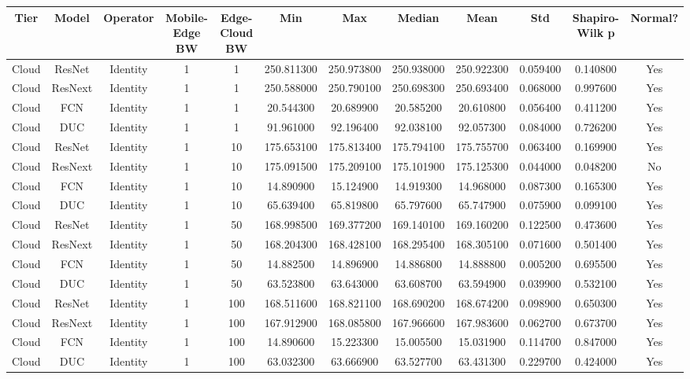 \begin{tabular}{|c||c||c||c||c||c||c||c||c||c||c||c|}
\toprule
Tier & Model & Operator & Mobile-Edge BW & Edge-Cloud BW & Min & Max & Median & Mean & Std & Shapiro-Wilk p & Normal? \\
\midrule
Cloud & ResNet & Identity & 1 & 1 & 250.811300 & 250.973800 & 250.938000 & 250.922300 & 0.059400 & 0.140800 & Yes \\
Cloud & ResNext & Identity & 1 & 1 & 250.588000 & 250.790100 & 250.698300 & 250.693400 & 0.068000 & 0.997600 & Yes \\
Cloud & FCN & Identity & 1 & 1 & 20.544300 & 20.689900 & 20.585200 & 20.610800 & 0.056400 & 0.411200 & Yes \\
Cloud & DUC & Identity & 1 & 1 & 91.961000 & 92.196400 & 92.038100 & 92.057300 & 0.084000 & 0.726200 & Yes \\
Cloud & ResNet & Identity & 1 & 10 & 175.653100 & 175.813400 & 175.794100 & 175.755700 & 0.063400 & 0.169900 & Yes \\
Cloud & ResNext & Identity & 1 & 10 & 175.091500 & 175.209100 & 175.101900 & 175.125300 & 0.044000 & 0.048200 & No \\
Cloud & FCN & Identity & 1 & 10 & 14.890900 & 15.124900 & 14.919300 & 14.968000 & 0.087300 & 0.165300 & Yes \\
Cloud & DUC & Identity & 1 & 10 & 65.639400 & 65.819800 & 65.797600 & 65.747900 & 0.075900 & 0.099100 & Yes \\
Cloud & ResNet & Identity & 1 & 50 & 168.998500 & 169.377200 & 169.140100 & 169.160200 & 0.122500 & 0.473600 & Yes \\
Cloud & ResNext & Identity & 1 & 50 & 168.204300 & 168.428100 & 168.295400 & 168.305100 & 0.071600 & 0.501400 & Yes \\
Cloud & FCN & Identity & 1 & 50 & 14.882500 & 14.896900 & 14.886800 & 14.888800 & 0.005200 & 0.695500 & Yes \\
Cloud & DUC & Identity & 1 & 50 & 63.523800 & 63.643000 & 63.608700 & 63.594900 & 0.039900 & 0.532100 & Yes \\
Cloud & ResNet & Identity & 1 & 100 & 168.511600 & 168.821100 & 168.690200 & 168.674200 & 0.098900 & 0.650300 & Yes \\
Cloud & ResNext & Identity & 1 & 100 & 167.912900 & 168.085800 & 167.966600 & 167.983600 & 0.062700 & 0.673700 & Yes \\
Cloud & FCN & Identity & 1 & 100 & 14.890600 & 15.223300 & 15.005500 & 15.031900 & 0.114700 & 0.847000 & Yes \\
Cloud & DUC & Identity & 1 & 100 & 63.032300 & 63.666900 & 63.527700 & 63.431300 & 0.229700 & 0.424000 & Yes \\

\end{tabular}
